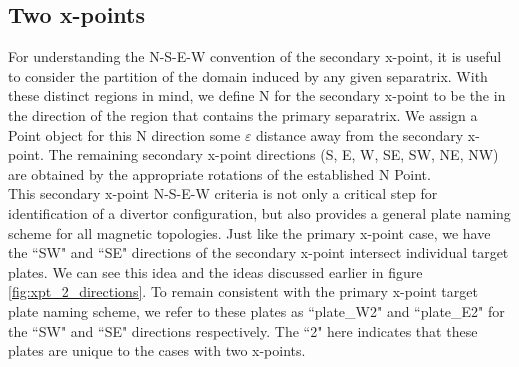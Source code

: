 \subsection{\label{sec:level2}Two x-points}
For understanding the N-S-E-W convention of the secondary x-point, it is useful to consider the partition of the domain induced by any given separatrix. With these distinct regions in mind, we define N for the secondary x-point to be the in the direction of the region that contains the primary separatrix. We assign a Point object for this N direction some $\varepsilon$ distance away from the secondary x-point. The remaining secondary x-point directions (S, E, W, SE, SW, NE, NW) are obtained by the appropriate rotations of the established N Point.\\ \indent
This secondary x-point N-S-E-W criteria is not only a critical step for identification of a divertor configuration, but also provides a general plate naming scheme for all magnetic topologies. Just like the primary x-point case, we have the ``SW" and ``SE" directions of the secondary x-point intersect individual target plates. We can see this idea and the ideas discussed earlier in figure \ref{fig:xpt_2_directions}. To remain consistent with the primary x-point target plate naming scheme, we refer to these plates as ``plate\_W2" and ``plate\_E2" for the ``SW" and ``SE" directions respectively. The ``2" here indicates that these plates are unique to the cases with two x-points.
